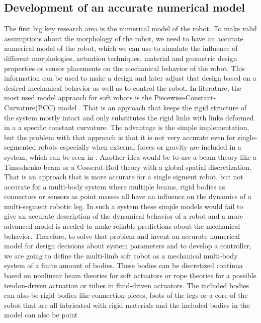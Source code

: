 \subsection*{Development of an accurate numerical model}\label{sub:Model}
%
The first big key research area is the numerical model of the robot.
To make valid assumptions about the morphology of the robot, we need to have an accurate numerical model of the robot, which we can use to simulate the influence of different
morphologies, actuation techniques, material and geometric design properties or sensor placements on the mechanical behavior of the robot. This information can be used to
make a design and later adjust that design based on a desired mechanical behavior as well as to control the robot. In literature, the most used model appraoch for soft robots is 
the Piecewise-Constant-Curvature(PCC) model \cite{Webster2010 , Santina2020}. That is an approach that keeps the rigid structure of the system mostly intact and only substitutes the rigid links with links deformed in a
a specific constant curvature. The advantage is the simple implementation, but the problem with that approach is that it is not very accurate even for single-segmented robots especially when external forces or gravity
are included in a system, which can be seen in \cite{Neppalli2007_conf}. Another idea would be to use a beam theory like a Timoshenko-beam \cite{Timoshenko1951_book} or a Cosserat-Rod theory \cite{} with
 a global spatial discretization. That is an approach that is more accurate for a single sigment robot, but not accurate for a multi-body system where multiple beams, rigid bodies as 
 connectors or sensors as point masses all have an influence on the dynamics of a multi-segment robotic leg. In such a system these simple models would fail to give an accurate description of the 
 dynamical behavior of a robot and a more advanced model is needed to make reliable predictions about the mechanical behavior. Therefore, to solve that problem and invent an accurate numerical model 
 for design decisions about system parameters and to develop a controller, we are going to define the multi-limb soft robot as a mechanical multi-body system of a finite amount of 
 bodies. These bodies can be discretized continua based on nonlinear beam theories for soft actuators or rope theories for a possible tendon-driven actuation or tubes in fluid-driven actuators. The included bodies can also be 
 rigid bodies like connection pieces, foots of the legs or a core of the robot that are all fabricated with rigid materials and the included bodies in the model can also be point
